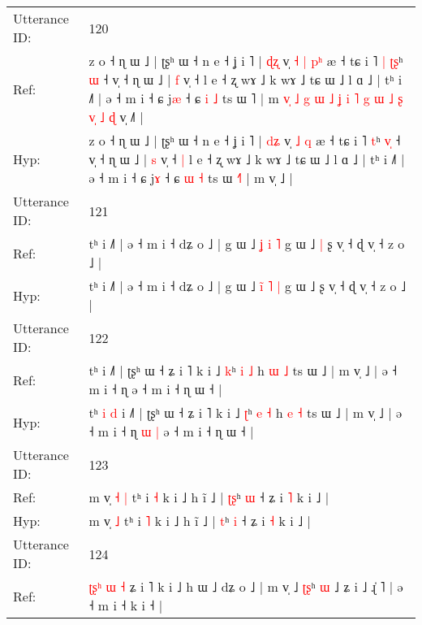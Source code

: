 \documentclass[10pt]{article}
\DeclareRobustCommand{\hl}[1]{{\textcolor{red}{#1}}}
\begin{document}
\begin{longtable}{ll}
 \\
\midrule
Utterance ID: & 120 \\
Ref: & z o ˧ ɳ ɯ ˩ | ʈʂʰ ɯ ˧ n e ˧ ʝ i ˥ | \hl{ɖ}\hl{ʐ} v̩\hl{ }\hl{˧} \hl{|} \hl{p}\hl{ʰ} æ ˧ tɕ i ˥\hl{ }\hl{|} \hl{ʈ}\hl{ʂ}ʰ \hl{}\hl{ɯ} ˧ v̩ ˧ ɳ ɯ ˩ | \hl{f} v̩ ˧\hl{}\hl{} l e ˧ ʐ wɤ ˩ k wɤ ˩ tɕ ɯ ˩ l ɑ ˩ | tʰ i ˩˥ | ə ˧ m i ˧ ɕ j\hl{æ} ˧ ɕ \hl{i} \hl{˩} ts ɯ \hl{}˥ | m\hl{ }\hl{v}\hl{̩}\hl{ }\hl{˩}\hl{ }\hl{g}\hl{ }\hl{ɯ}\hl{ }\hl{˩}\hl{ }\hl{ʝ}\hl{ }\hl{i}\hl{ }\hl{˥}\hl{ }\hl{g}\hl{ }\hl{ɯ}\hl{ }\hl{˩}\hl{ }\hl{ʂ}\hl{ }\hl{v}\hl{̩}\hl{ }\hl{˩}\hl{ }\hl{ɖ} v̩ ˩\hl{˥} |
 \\
Hyp: & z o ˧ ɳ ɯ ˩ | ʈʂʰ ɯ ˧ n e ˧ ʝ i ˥ | \hl{d}\hl{ʑ} v̩\hl{}\hl{} \hl{˩} \hl{}\hl{q} æ ˧ tɕ i ˥\hl{}\hl{} \hl{}\hl{t}ʰ \hl{v}\hl{̩} ˧ v̩ ˧ ɳ ɯ ˩ | \hl{s} v̩ ˧\hl{ }\hl{|} l e ˧ ʐ wɤ ˩ k wɤ ˩ tɕ ɯ ˩ l ɑ ˩ | tʰ i ˩˥ | ə ˧ m i ˧ ɕ j\hl{ɤ} ˧ ɕ \hl{ɯ} \hl{˧} ts ɯ \hl{˧}˥ | m\hl{}\hl{}\hl{}\hl{}\hl{}\hl{}\hl{}\hl{}\hl{}\hl{}\hl{}\hl{}\hl{}\hl{}\hl{}\hl{}\hl{}\hl{}\hl{}\hl{}\hl{}\hl{}\hl{}\hl{}\hl{}\hl{}\hl{}\hl{}\hl{}\hl{}\hl{}\hl{} v̩ ˩\hl{} |
 \\
\midrule
Utterance ID: & 121 \\
Ref: & tʰ i ˩˥ | ə ˧ m i ˧ dʑ o ˩ | g ɯ ˩ \hl{}\hl{ʝ} \hl{i} \hl{˥} g ɯ ˩\hl{ }\hl{|} ʂ v̩ ˧ ɖ v̩ ˧ z o ˩ |
 \\
Hyp: & tʰ i ˩˥ | ə ˧ m i ˧ dʑ o ˩ | g ɯ ˩ \hl{i}\hl{̃} \hl{˥} \hl{|} g ɯ ˩\hl{}\hl{} ʂ v̩ ˧ ɖ v̩ ˧ z o ˩ |
 \\
\midrule
Utterance ID: & 122 \\
Ref: & tʰ\hl{}\hl{}\hl{}\hl{} i ˩˥ | ʈʂʰ ɯ ˧ ʑ i ˥ k i ˩ \hl{k}ʰ \hl{i} \hl{˩} h \hl{ɯ} \hl{˩} ts ɯ ˩ | m v̩ ˩ | ə ˧ m i ˧ ɳ\hl{}\hl{}\hl{}\hl{} ə ˧ m i ˧ ɳ ɯ ˧ |
 \\
Hyp: & tʰ\hl{ }\hl{i}\hl{ }\hl{d} i ˩˥ | ʈʂʰ ɯ ˧ ʑ i ˥ k i ˩ \hl{ʈ}ʰ \hl{e} \hl{˧} h \hl{e} \hl{˧} ts ɯ ˩ | m v̩ ˩ | ə ˧ m i ˧ ɳ\hl{ }\hl{ɯ}\hl{ }\hl{|} ə ˧ m i ˧ ɳ ɯ ˧ |
 \\
\midrule
Utterance ID: & 123 \\
Ref: & m v̩\hl{ }\hl{˧} \hl{|} tʰ i \hl{˧} k i ˩ h ĩ ˩ | \hl{ʈ}\hl{ʂ}ʰ \hl{ɯ} ˧ ʑ i \hl{˥} k i ˩ |
 \\
Hyp: & m v̩\hl{}\hl{} \hl{˩} tʰ i \hl{˥} k i ˩ h ĩ ˩ | \hl{}\hl{t}ʰ \hl{i} ˧ ʑ i \hl{˧} k i ˩ |
 \\
\midrule
Utterance ID: & 124 \\
Ref: & \hl{}\hl{ʈ}\hl{ʂ}\hl{ʰ} \hl{}\hl{ɯ} \hl{˧} ʑ i ˥ k i ˩ h ɯ ˩ dʑ o ˩ | m v̩ ˩ \hl{ʈ}\hl{ʂ}ʰ \hl{ɯ} ˩ ʑ i ˩ ɻ̍ ˥ | ə ˧ m i ˧ k i ˧ |
 \\

\end{longtable}
\end{document}
